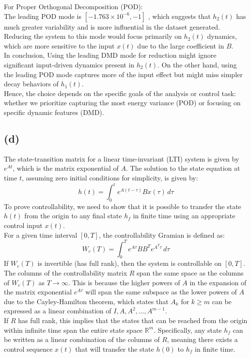 \documentclass[12pt]{article}
\begin{document}
For Proper Orthogonal Decomposition (POD): \\
The leading POD mode is $[-1.763 \times 10^{-6},-1]$ , which suggests that $h_2(t)$ has much greater variability and is more influential in the dataset generated. Reducing the system to this mode would focus primarily on $h_2(t)$ dynamics, which are more sensitive to the input $x(t)$ due to the large coefficient in $B$.\\

In conclusion, Using the leading DMD mode for reduction might ignore significant input-driven dynamics present in $h_2(t)$. On the other hand, using the leading POD mode captures more of the input effect but might miss simpler decay behaviors of $h_1(t)$. \\
Hence, the choice depends on the specific goals of the analysis or control task: whether we prioritize capturing the most energy variance (POD) or focusing on specific dynamic features (DMD).

\subsection*{(d)}
The state-transition matrix for a linear time-invariant (LTI) system is given by $e^{At}$, which is the matrix exponential of $A$. The solution to the state equation at time $t$, assuming zero initial conditions for simplicity, is given by:
\[
h(t) = \int_{0}^{t} e^{A(t-\tau)} Bx(\tau) \, d\tau
\]
To prove controllability, we need to show that it is possible to transfer the state $h(t)$ from the origin to any final state $h_f$ in finite time using an appropriate control input $x(t)$.\\

For a given time interval $[0,T]$, the controllability Gramian is defined as:
\[
W_c(T) = \int_{0}^{T} e^{A\tau} BB^T e^{A^T\tau} \, d\tau
\]
If $W_c(T)$ is invertible (has full rank), then the system is controllable on $[0,T]$.\\

The columns of the controllability matrix $R$ span the same space as the columns of $W_c(T)$ as $T\rightarrow \infty$. This is because the higher powers of $A$ in the expansion of the matrix exponential $e^{A\tau}$ will span the same subspace as the lower powers of $A$ due to the Cayley-Hamilton theorem, which states that $A_k$ for $k\geq m$ can be expressed as a linear combination of $I,A,A^2,\dots,A^{m-1}$.\\

If $R$ has full rank, this implies that the states that can be reached from the origin within infinite time span the entire state space $\mathbb{R}^m$. Specifically, any state $h_f$ can be written as a linear combination of the columns of $R$, meaning there exists a control sequence $x(t)$ that will transfer the state $h(0)$ to $h_f$ in finite time.\\
\end{document}
